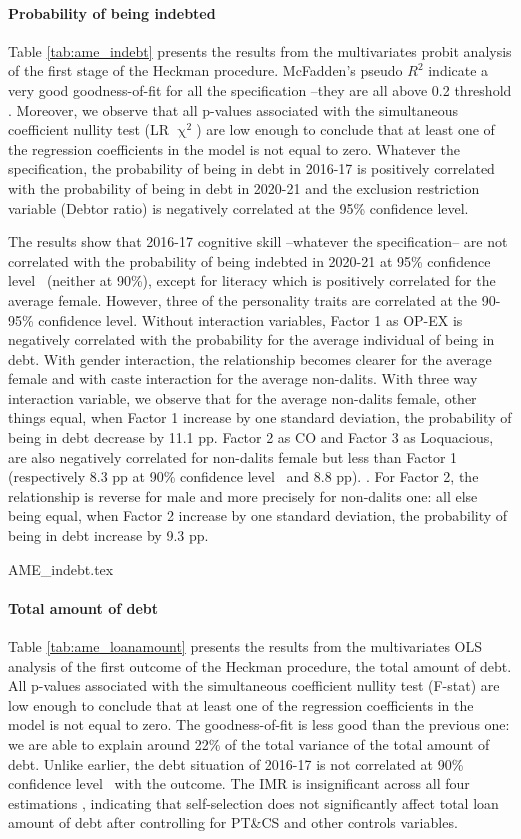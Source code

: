 \documentclass[a4paper, 11pt, onecolumn]{article}
\newcommand{\sd}{standard deviation}
\newcommand{\aebe}{all else being equal}
\newcommand{\ote}{other things equal}
\newcommand{\cl}{confidence level}
\newcommand{\lit}{\dev{literature}}
\begin{document}
\paragraph{Probability of being indebted}
Table \ref{tab:ame_indebt} presents the results from the multivariates probit analysis of the first stage of the Heckman procedure.
McFadden's pseudo $R^2$ indicate a very good goodness-of-fit for all the specification --they are all above 0.2 threshold \citep{McFadden1979}.
Moreover, we observe that all p-values associated with the simultaneous coefficient nullity test (LR $\upchi^2$) are low enough to conclude that at least one of the regression coefficients in the model is not equal to zero.
Whatever the specification, the probability of being in debt in 2016-17 is positively correlated with the probability of being in debt in 2020-21 and the exclusion restriction variable (Debtor ratio) is negatively correlated at the 95\% \cl. 

The results show that 2016-17 cognitive skill --whatever the specification-- are not correlated with the probability of being indebted in 2020-21 at 95\% \cl~ (neither at 90\%), except for literacy which is positively correlated for the average female.
However, three of the personality traits are correlated at the 90-95\% \cl. 
Without interaction variables, Factor 1 as OP-EX is negatively correlated with the probability for the average individual of being in debt.
With gender interaction, the relationship becomes clearer for the average female and with caste interaction for the average non-dalits.
With three way interaction variable, we observe that for the average non-dalits female, \ote, when Factor 1 increase by one \sd, the probability of being in debt decrease by 11.1 pp.
Factor 2 as CO and Factor 3 as Loquacious, are also negatively correlated for non-dalits female but less than Factor 1 (respectively 8.3 pp at 90\% \cl~ and 8.8 pp).
\lit.
For Factor 2, the relationship is reverse for male and more precisely for non-dalits one: \aebe, when Factor 2 increase by one \sd, the probability of being in debt increase by 9.3 pp.

{AME_indebt.tex}


\paragraph{Total amount of debt}
Table \ref{tab:ame_loanamount} presents the results from the multivariates OLS analysis of the first outcome of the Heckman procedure, the total amount of debt.
All p-values associated with the simultaneous coefficient nullity test (F-stat) are low enough to conclude that at least one of the regression coefficients in the model is not equal to zero.
The goodness-of-fit is less good than the previous one: we are able to explain around 22\% of the total variance of the total amount of debt.
Unlike earlier, the debt situation of 2016-17 is not correlated at 90\% \cl~ with the outcome.
The IMR is insignificant across all four estimations , indicating that self-selection does not significantly affect total loan amount of debt after controlling for PT\&CS and other controls variables.
\end{document}
